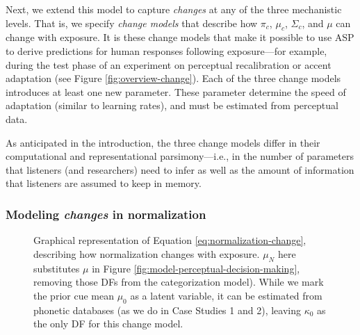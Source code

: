 \documentclass[
  11pt,
  man,floatsintext]{apa6}
\begin{document}
Next, we extend this model to capture \emph{changes} at any of the three mechanistic levels. That is, we specify \emph{change models} that describe how \(\pi_c\), \(\mu_c\), \(\Sigma_c\), and \(\mu\) can change with exposure. It is these change models that make it possible to use ASP to derive predictions for human responses following exposure---for example, during the test phase of an experiment on perceptual recalibration or accent adaptation (see Figure \ref{fig:overview-change}). Each of the three change models introduces at least one new parameter. These parameter determine the speed of adaptation (similar to learning rates), and must be estimated from perceptual data.

As anticipated in the introduction, the three change models differ in their computational and representational parsimony---i.e., in the number of parameters that listeners (and researchers) need to infer as well as the amount of information that listeners are assumed to keep in memory.

\subsubsection{\texorpdfstring{Modeling \emph{changes} in normalization}{Modeling changes in normalization}}\label{sec:change-normalization}

\begin{figure}
\centering
\caption{Graphical representation of Equation \ref{eq:normalization-change}, describing how normalization changes with exposure. $\mu_N$ here substitutes $\mu$ in Figure \ref{fig:model-perceptual-decision-making}, removing those DFs from the categorization model). While we mark the prior cue mean $\mu_0$ as a latent variable, it can be estimated from phonetic databases (as we do in  Case Studies 1 and 2), leaving $\kappa_0$ as the only DF for this change model.\label{fig:graphical-model-changes-normalization}}
\end{figure}
\end{document}
